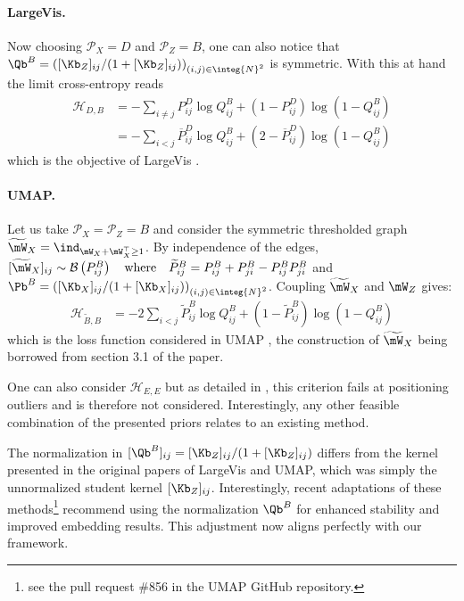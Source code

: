 \paragraph{LargeVis.}
Now choosing $\mathcal{P}_{X} = D$ and $\mathcal{P}_{Z} = B$, one can also notice that $\Qb^{B} = \left( [\Kb_Z]_{ij} / (1+[\Kb_Z]_{ij}) \right)_{(i,j) \in \integ{N}^2}$ is symmetric. With this at hand the limit cross-entropy reads
\begin{align*}
    \mathcal{H}_{D,B} &= - \sum_{i \neq j} P^{D}_{ij} \log Q^{B}_{ij} + \left(1 - P^{D}_{ij} \right) \log\left(1-Q^{B}_{ij} \right) \\
    &= - \sum_{i < j} \overline{P}^{D}_{ij} \log Q^{B}_{ij} + \left(2-\overline{P}^{D}_{ij}\right) \log (1- Q^{B}_{ij})
\end{align*}
which is the objective of LargeVis \citep{tang2016visualizing}.

\paragraph{UMAP.}
Let us take $\mathcal{P}_{X} = \mathcal{P}_{Z} = B$ and consider the symmetric thresholded graph $\widetilde{\mW}_{X} = \ind_{\mW_{X} + \mW_X^\top \geq 1}$. By independence of the edges, $[\widetilde{\mW}_{X}]_{ij} \sim \mathcal{B}\left(P^{B}_{ij} \right) \quad \text{where} \quad  \widetilde{P}^{B}_{ij} = P^{B}_{ij} + P^{B}_{ji} - P^{B}_{ij} P^{B}_{ji}$ and $\Pb^{B} = \left( [\Kb_X]_{ij} / (1+[\Kb_X]_{ij}) \right)_{(i,j) \in \integ{N}^2}$. Coupling $\widetilde{\mW}_{X}$ and $\mW_{Z}$ gives:
\begin{align*}
    \mathcal{H}_{\widetilde{B},B} &= -2 \sum_{i<j} \widetilde{P}_{ij}^{B} \log Q_{ij}^{B} + \left(1 - \widetilde{P}_{ij}^{B} \right) \log \left( 1 - Q_{ij}^{B} \right)
\end{align*}
which is the loss function considered in UMAP \citep{mcinnes2018umap}, the construction of $\widetilde{\mW}_{X}$ being borrowed from section 3.1 of the paper.

\begin{remark}
One can also consider $\mathcal{H}_{E,E}$ but as detailed in \citep{maaten2008tSNE}, this criterion fails at positioning outliers and is therefore not considered. 
Interestingly, any other feasible combination of the presented priors relates to an existing method.
\end{remark}

\begin{remark}
    The normalization in $[\Qb^{B}]_{ij} = [\Kb_Z]_{ij} / (1+[\Kb_Z]_{ij})$ differs from the kernel presented in the original papers of LargeVis and UMAP, which was simply the unnormalized student kernel $[\Kb_Z]_{ij}$. Interestingly, recent adaptations of these methods\footnote{see \eg the pull request \#856 in the UMAP GitHub repository.} recommend using the normalization $\Qb^{B}$ for enhanced stability and improved embedding results. This adjustment now aligns perfectly with our framework.
\end{remark}


